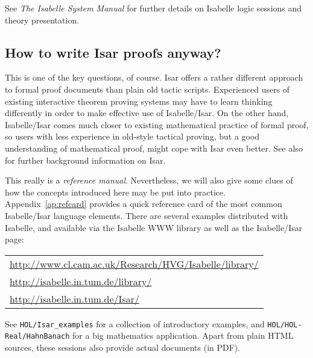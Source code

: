 \medskip

See \emph{The Isabelle System Manual} \cite{isabelle-sys} for further details
on Isabelle logic sessions and theory presentation.


\subsection{How to write Isar proofs anyway?}

This is one of the key questions, of course.  Isar offers a rather different
approach to formal proof documents than plain old tactic scripts.  Experienced
users of existing interactive theorem proving systems may have to learn
thinking differently in order to make effective use of Isabelle/Isar.  On the
other hand, Isabelle/Isar comes much closer to existing mathematical practice
of formal proof, so users with less experience in old-style tactical proving,
but a good understanding of mathematical proof, might cope with Isar even
better.  See also \cite{Wenzel:1999:TPHOL} for further background information
on Isar.

\medskip This really is a \emph{reference manual}.  Nevertheless, we will also
give some clues of how the concepts introduced here may be put into practice.
Appendix~\ref{ap:refcard} provides a quick reference card of the most common
Isabelle/Isar language elements.  There are several examples distributed with
Isabelle, and available via the Isabelle WWW library as well as the
Isabelle/Isar page:
\begin{center}\small
  \begin{tabular}{l}
    \url{http://www.cl.cam.ac.uk/Research/HVG/Isabelle/library/} \\
    \url{http://isabelle.in.tum.de/library/} \\[1ex]
    \url{http://isabelle.in.tum.de/Isar/} \\
  \end{tabular}
\end{center}

See \texttt{HOL/Isar_examples} for a collection of introductory examples, and
\texttt{HOL/HOL-Real/HahnBanach} for a big mathematics application.  Apart
from plain HTML sources, these sessions also provide actual documents (in
PDF).


